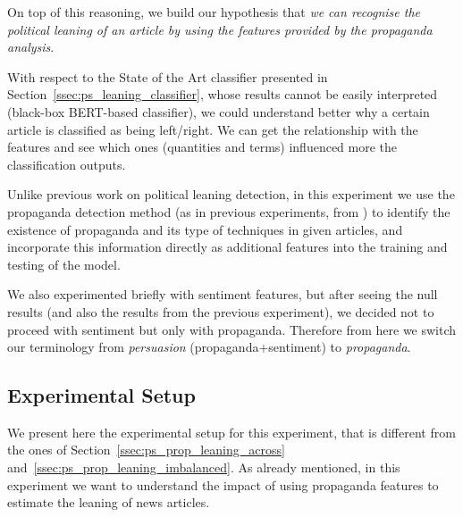 On top of this reasoning, we build our hypothesis that \emph{we can recognise the political leaning of an article by using the features provided by the propaganda analysis}.

With respect to the State of the Art classifier presented in Section~\ref{ssec:ps_leaning_classifier}, whose results cannot be easily interpreted (black-box BERT-based classifier),
we could understand better why a certain article is classified as being left/right. We can get the relationship with the features and see which ones (quantities and terms) influenced more the classification outputs. 



Unlike previous work on political leaning detection, in this experiment we use the propaganda detection method (as in previous experiments, from \citet{da2019fine}) to identify the existence of propaganda and its type of techniques in given articles, and incorporate this information directly as additional features into the training and testing of the model.  

We also experimented briefly with sentiment features, but after seeing the null results (and also the results from the previous experiment), we decided not to proceed with sentiment but only with propaganda.
Therefore from here we switch our terminology from \emph{persuasion} (propaganda+sentiment) to \emph{propaganda}.




\subsection{Experimental Setup}
\label{ssec:ps_prop_leaning_classifier_setup}

We present here the experimental setup for this experiment, that is different from the ones of Section~\ref{ssec:ps_prop_leaning_across} and~\ref{ssec:ps_prop_leaning_imbalanced}.
As already mentioned, in this experiment we want to understand the impact of using propaganda features to estimate the leaning of news articles.

